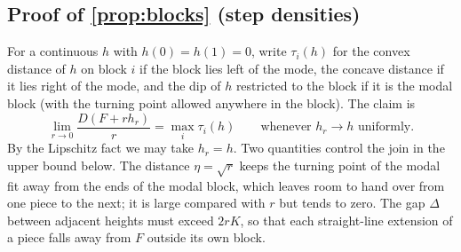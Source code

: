 \subsection{Proof of \cref{prop:blocks} (step densities)}


For a continuous $h$ with $h(0)=h(1)=0$, write $\tau_i(h)$ for the convex distance of $h$ on block $i$ if the block lies left of the mode, the concave distance if it lies right of the mode, and the dip of $h$ restricted to the block if it is the modal block (with the turning point allowed anywhere in the block). The claim is
\[
\lim_{r\to0}\frac{D(F+rh_r)}{r}=\max_i\tau_i(h)\qquad\text{whenever }h_r\to h\text{ uniformly}.
\]
By the Lipschitz fact we may take $h_r=h$. Two quantities control the join in the upper bound below. The distance $\eta=\sqrt r$ keeps the turning point of the modal fit away from the ends of the modal block, which leaves room to hand over from one piece to the next; it is large compared with $r$ but tends to zero. The gap $\Delta$ between adjacent heights must exceed $2rK$, so that each straight-line extension of a piece falls away from $F$ outside its own block.

